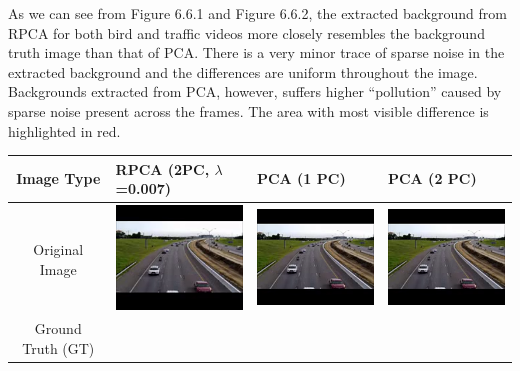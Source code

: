 \documentclass[11pt]{scrartcl} %
\theoremstyle{plain}
\begin{document}
As we can see from Figure 6.6.1 and Figure 6.6.2, the extracted background from RPCA for both bird and traffic videos more closely resembles the background truth image than that of PCA. There is a very minor trace of sparse noise in the extracted background and the differences are uniform throughout the image. Backgrounds extracted from PCA, however, suffers higher “pollution” caused by sparse noise present across the frames. The area with most visible difference is highlighted in red.

\bigskip
\begin{minipage}{\linewidth}
\bgroup
  \begin{tabular}{ | c | m{2.8cm} | m{2.8cm} | m{2.8cm} | }
    \hline
    Image Type & RPCA \linebreak (2PC, $\lambda$=0.007) & PCA \linebreak (1 PC) & PCA \linebreak (2 PC)
    \\ \hline
	Original \linebreak Image
    &
    \begin{minipage}{.3\textwidth}
      \includegraphics[width=\linewidth, width=25mm]{figures_video/traffic/original.png}
    \end{minipage}
    & 
    \begin{minipage}{.3\textwidth}
      \includegraphics[width=\linewidth, width=25mm]{figures_video/traffic/original.png}
    \end{minipage}
    &
    \begin{minipage}{.3\textwidth}
      \includegraphics[width=\linewidth, width=25mm]{figures_video/traffic/original.png}
    \end{minipage}
    \\[5ex] \hline
	Ground Truth (GT)

\end{tabular}
\end{minipage}
\end{document}
